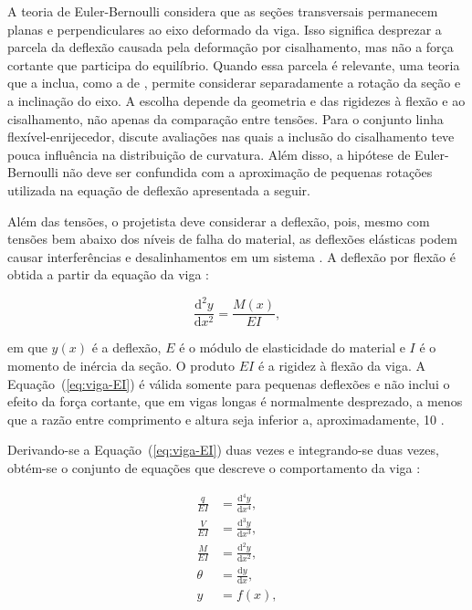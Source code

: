 \documentclass[arial,centeredequations,english,brazilian,oneside,section=TITLE]{ifes8}
\begin{document}
A teoria de Euler-Bernoulli considera que as seções transversais permanecem planas e
perpendiculares ao eixo deformado da viga. Isso significa desprezar a parcela da deflexão
causada pela deformação por cisalhamento, mas não a força cortante que participa do equilíbrio.
Quando essa parcela é relevante, uma teoria que a inclua, como a de , permite
considerar separadamente a rotação da seção e a inclinação do eixo. A escolha depende da
geometria e das rigidezes à flexão e ao cisalhamento, não apenas da comparação entre tensões.
Para o conjunto linha flexível-enrijecedor,  discute avaliações
nas quais a inclusão do cisalhamento teve pouca influência na distribuição de curvatura.
Além disso, a hipótese de Euler-Bernoulli não deve ser confundida com a aproximação de
pequenas rotações utilizada na equação de deflexão apresentada a seguir.

Além das tensões, o projetista deve considerar a deflexão, pois, mesmo com tensões
bem abaixo dos níveis de falha do material, as deflexões elásticas podem causar
interferências e desalinhamentos em um sistema \cite{Norton2013}. A deflexão
por flexão é obtida a partir da equação da viga
\cite{Norton2013}:

\begin{equation}
  \label{eq:viga-EI}
  \frac{\mathrm{d}^2 y}{\mathrm{d}x^2} = \frac{M(x)}{E I},
\end{equation}

em que $y(x)$ é a deflexão, $E$ é o módulo de elasticidade do material e $I$ é o
momento de inércia da seção. O produto $E I$ é a rigidez à flexão da viga. A
Equação~(\ref{eq:viga-EI}) é válida somente para pequenas deflexões e não inclui o
efeito da força cortante, que em vigas longas é normalmente desprezado, a menos que a
razão entre comprimento e altura seja inferior a, aproximadamente, 10
\cite{Norton2013}.

Derivando-se a Equação~(\ref{eq:viga-EI}) duas vezes e integrando-se duas vezes,
obtém-se o conjunto de equações que descreve o comportamento da viga
\cite{Norton2013}:

\begin{align}
  \frac{q}{E I} &= \frac{\mathrm{d}^4 y}{\mathrm{d}x^4}, \label{eq:viga-q}\\
  \frac{V}{E I} &= \frac{\mathrm{d}^3 y}{\mathrm{d}x^3}, \label{eq:viga-V}\\
  \frac{M}{E I} &= \frac{\mathrm{d}^2 y}{\mathrm{d}x^2}, \label{eq:viga-M}\\
  \theta        &= \frac{\mathrm{d}y}{\mathrm{d}x}, \label{eq:viga-theta}\\
  y             &= f(x), \label{eq:viga-y}
\end{align}
\end{document}
